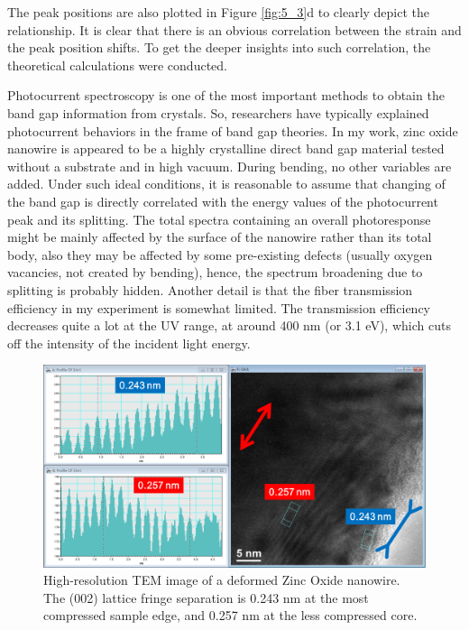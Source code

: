 The peak positions are also plotted in Figure \ref{fig:5_3}d to clearly depict the relationship. 
It is clear that there is an obvious correlation between the strain and the peak position shifts. 
To get the deeper insights into such correlation, the theoretical calculations were conducted. 

Photocurrent spectroscopy is one of the most important methods to obtain the band gap information from crystals. 
So, researchers have typically explained photocurrent behaviors in the frame of band gap theories. 
In my work, zinc oxide nanowire is appeared to be a highly crystalline direct band gap material tested without a substrate and in high vacuum. During bending, no other variables are added. 
Under such ideal conditions, it is reasonable to assume that changing of the band gap is directly correlated with the energy values of the photocurrent peak and its splitting. 
The total spectra containing an overall photoresponse might be mainly affected by the surface of the nanowire rather than its total body, also they may be affected by some pre-existing defects (usually oxygen vacancies, not created by bending), hence, the spectrum broadening due to splitting is probably hidden. 
Another detail is that the fiber transmission efficiency in my experiment is somewhat limited. 
The transmission efficiency decreases quite a lot at the UV range, at around 400 nm (or 3.1 eV), which cuts off the intensity of the incident light energy. 

\begin{figure}  
\centering
\includegraphics[width=\textwidth]{figures/figure5_s2}
\caption[Localized strain in HRTEM image]{High-resolution TEM image of a deformed Zinc Oxide nanowire. The (002) lattice fringe separation is 0.243 nm at the most compressed sample edge, and 0.257 nm at the less compressed core. 
\label{fig:5_s2}}
\end{figure}


